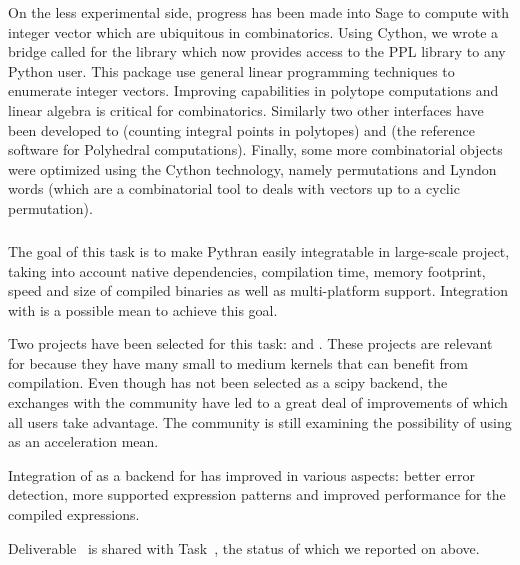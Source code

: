   On the less experimental side, progress has been made into Sage to compute
  with integer vector which are ubiquitous in combinatorics. Using Cython, we
  wrote a bridge called  for the  library which
  now provides access to the PPL library to any Python user. This package use
  general linear programming techniques to enumerate integer vectors.
  Improving \Sage capabilities in polytope computations and linear algebra is
  critical for combinatorics. Similarly two other interfaces have been developed
  to  (counting integral points in polytopes) and
   (the reference software for Polyhedral computations).
  Finally, some more combinatorial objects were optimized using the Cython
  technology, namely permutations and Lyndon words (which are a combinatorial
  tool to deals with vectors up to a cyclic permutation).


  \subparagraph{}

  The goal of this task is to make Pythran easily integratable in large-scale
  project, taking into account native dependencies, compilation time, memory
  footprint, speed and size of compiled binaries as well as multi-platform
  support. Integration with  is a possible mean to achieve
  this goal.

  Two projects have been selected for this task:  and
  . These projects are relevant for 
  because they have many small to medium kernels that can benefit from
  compilation. Even though  has not been selected as a scipy
  backend, the exchanges with the community have led to a great deal of
  improvements of which all  users take advantage.  The
   community is still examining the possibility of using
   as an acceleration mean.

  Integration of   as a  backend for
   has improved in various aspects: better error detection,
  more supported expression patterns and improved performance for the compiled
  expressions.

Deliverable~ is shared with
Task~, the status of which we reported on above.

  \subparagraph{}
  

